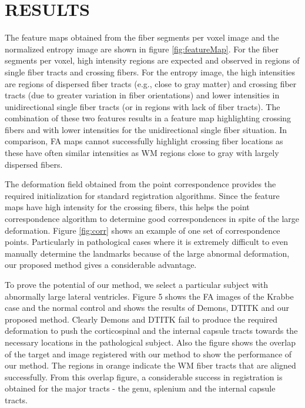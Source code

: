 \documentclass{llncs}
\begin{document}
\section{RESULTS}

The feature maps obtained from the fiber segments per voxel image and the normalized entropy image are shown in figure \ref{fig:featureMap}. For the fiber segments per voxel,  high intensity regions are expected and observed in regions of single fiber tracts and crossing fibers. For the entropy image, the high intensities are regions of dispersed fiber tracts (e.g., close to gray matter) and crossing fiber tracts (due to greater variation in fiber orientations) and lower intensities in unidirectional single fiber tracts (or in regions with lack of fiber tracts). The combination of  these two features results in a feature map highlighting crossing fibers and with lower intensities for the unidirectional single fiber situation. In comparison, FA maps cannot successfully highlight crossing fiber locations as these have often similar intensities as WM regions close to gray with largely dispersed fibers.

The deformation field obtained from the point correspondence provides the required initialization for standard registration algorithms. Since the feature maps have high intensity for the crossing fibers, this helps the point correspondence algorithm to determine good correspondences in spite of the large deformation. Figure \ref{fig:corr} shows an example of one set of correspondence points. Particularly in pathological cases where it is extremely difficult to even manually determine the landmarks because of the large abnormal deformation, our proposed method gives a considerable advantage.

To prove the potential of our method, we select a particular subject with abnormally large lateral ventricles. Figure 5 shows the FA images of the Krabbe case and the normal control and shows the results of Demons, DTITK and our proposed method. Clearly Demons and DTITK fail to produce the required deformation to push the corticospinal and the internal capsule tracts towards the necessary locations in the pathological subject. Also the figure shows the overlap of the target and image registered with our method to show the performance of our method. The regions in orange indicate the WM fiber tracts that are aligned successfully. From this overlap figure, a considerable success in registration is obtained for the major tracts - the genu, splenium and the internal capsule tracts.
\end{document}
